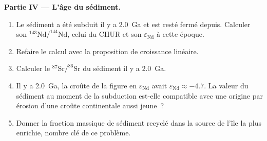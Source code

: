 \begin{problem}
\noindent\textbf{Partie IV --- L'âge du sédiment.}
\begin{enumerate}[resume]
\item Le sédiment a été subduit il y a \qty{2.0}{Ga} et est resté fermé depuis.
Calculer son $^{143}\mathrm{Nd}/^{144}\mathrm{Nd}$, celui du CHUR et son
$\varepsilon_{\mathrm{Nd}}$ à cette époque.
\item Refaire le calcul avec la proposition de croissance linéaire.
\item Calculer le $^{87}\mathrm{Sr}/^{86}\mathrm{Sr}$ du sédiment il y a \qty{2.0}{Ga}.
\item Il y a \qty{2.0}{Ga}, la croûte de la figure en $\varepsilon_{\mathrm{Nd}}$ avait
$\varepsilon_{\mathrm{Nd}} \approx -4.7$. La valeur du sédiment au moment de la subduction est-elle compatible
avec une origine par érosion d'une croûte continentale aussi jeune~?
\item Donner la fraction massique de sédiment recyclé dans la source de l'île la plus
enrichie, nombre clé de ce problème.
\end{enumerate}
\end{problem}
